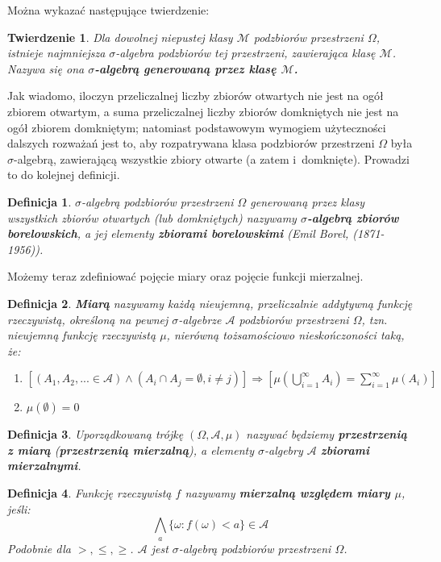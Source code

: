 \documentclass[10pt,a4paper]{article}
\newtheorem{defin}{Definicja}[section]
\newtheorem{twier}{Twierdzenie}[section]
\begin{document}
Można wykazać następujące twierdzenie:
\begin{twier}
Dla dowolnej niepustej klasy $\mathscr{M}$ podzbiorów przestrzeni $\Omega$, istnieje najmniejsza $\sigma$-algebra podzbiorów tej przestrzeni, 
zawierająca klasę $\mathscr{M}$. Nazywa się ona \textbf{$\sigma$-algebrą generowaną przez klasę $\mathscr{M}$.}
\end{twier}

Jak wiadomo, iloczyn przeliczalnej liczby zbiorów otwartych nie jest na ogół zbiorem otwartym, a suma przeliczalnej liczby zbiorów domkniętych nie jest na ogół
zbiorem domkniętym; natomiast podstawowym wymogiem użyteczności dalszych rozważań jest to, aby rozpatrywana klasa podzbiorów przestrzeni $\Omega$ była $\sigma$-algebrą,
zawierającą wszystkie zbiory otwarte (a zatem i~domknięte). Prowadzi to do kolejnej definicji.
\begin{defin}
$\sigma$-algebrą podzbiorów przestrzeni $\Omega$ generowaną przez klasy wszystkich zbiorów otwartych (lub domkniętych) nazywamy \textbf{$\sigma$-algebrą 
zbiorów borelowskich}, a jej elementy \textbf{zbiorami borelowskimi} (Emil Borel, (1871-1956)).
\end{defin}
Możemy teraz zdefiniować pojęcie miary oraz pojęcie funkcji mierzalnej.
\begin{defin}
\textbf{Miarą} nazywamy każdą nieujemną, przeliczalnie addytywną funkcję rzeczywistą, określoną na pewnej $\sigma$-algebrze $\mathscr{A}$ podzbiorów przestrzeni $\Omega$,
tzn. nieujemną funkcję rzeczywistą $\mu$, nierówną tożsamościowo nieskończoności taką, że:
\begin{enumerate}
\item $[(A_1,A_2,...\in\mathscr{A})\land(A_i\cap A_j=\emptyset,i\neq j)]\Longrightarrow[\mu(\bigcup_{i=1}^{\infty}A_i)=\sum_{i=1}^{\infty}\mu(A_i)]$
\item $\mu(\emptyset)=0$
\end{enumerate}
\end{defin}

\begin{defin}
Uporządkowaną trójkę $(\Omega, \mathscr{A}, \mu)$ nazywać będziemy \textbf{przestrzenią z miarą} (\textbf{przestrzenią mierzalną}), a elementy $\sigma$-algebry
$\mathscr{A}$ \textbf{zbiorami mierzalnymi}.
\end{defin}
\begin{defin}
Funkcję rzeczywistą $f$ nazywamy \textbf{mierzalną względem miary $\mu$}, jeśli:
\begin{equation}
\bigwedge_a\{\omega:f(\omega)<a\}\in \mathscr{A}
\end{equation}
Podobnie dla $>,\leq,\geq$. $\mathscr{A}$ jest $\sigma$-algebrą podzbiorów przestrzeni $\Omega$.
\end{defin}
\end{document}
